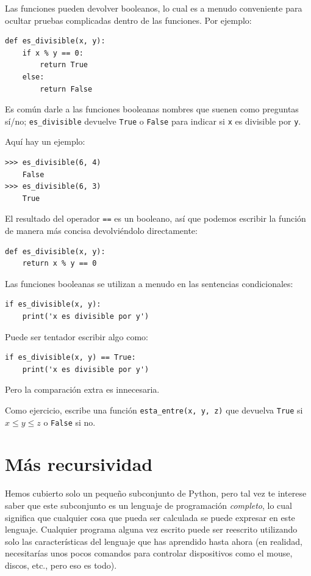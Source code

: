 \documentclass[10pt]{book}
\begin{document}
Las funciones pueden devolver booleanos, lo cual es a menudo conveniente para ocultar
pruebas complicadas dentro de las funciones.  
Por ejemplo:

\begin{verbatim}
def es_divisible(x, y):
    if x % y == 0:
        return True
    else:
        return False
\end{verbatim}
%
Es común darle a las funciones booleanas nombres que suenen como preguntas
sí/no; \verb"es_divisible" devuelve {\tt True} o {\tt False}
para indicar si {\tt x} es divisible por {\tt y}.

Aquí hay un ejemplo:

\begin{verbatim}
>>> es_divisible(6, 4)
    False
>>> es_divisible(6, 3)
    True
\end{verbatim}
%
El resultado del operador {\tt ==} es un booleano, así que podemos escribir la
función de manera más concisa devolviéndolo directamente:

\begin{verbatim}
def es_divisible(x, y):
    return x % y == 0
\end{verbatim}
%
Las funciones booleanas se utilizan a menudo en las sentencias condicionales:

\begin{verbatim}
if es_divisible(x, y):
    print('x es divisible por y')
\end{verbatim}
%
Puede ser tentador escribir algo como:

\begin{verbatim}
if es_divisible(x, y) == True:
    print('x es divisible por y')
\end{verbatim}
%
Pero la comparación extra es innecesaria.

Como ejercicio, escribe una función \verb"esta_entre(x, y, z)" que
devuelva {\tt True} si $x \le y \le z$ o {\tt False} si no.


\section{Más recursividad}
\label{more.recursion}

Hemos cubierto solo un pequeño subconjunto de Python, pero tal vez
te interese saber que este subconjunto es un lenguaje de programación {\em completo},
lo cual significa que cualquier cosa que pueda ser
calculada se puede expresar en este lenguaje.  Cualquier programa alguna vez escrito
puede ser reescrito utilizando solo las características del lenguaje que has aprendido
hasta ahora (en realidad, necesitarías unos pocos comandos para controlar dispositivos
como el mouse, discos, etc., pero eso es todo).
\end{document}
